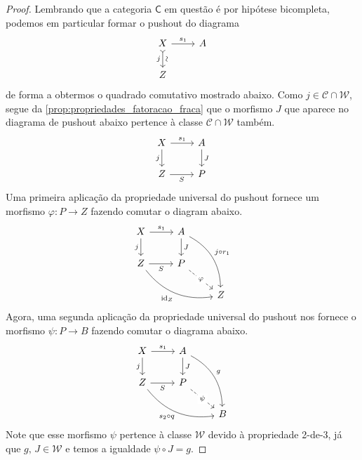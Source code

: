 \begin{proof}
  Lembrando que a categoria $\mathsf{C}$ em questão é por hipótese bicompleta, podemos em particular formar o pushout do diagrama
  \begin{displaymath}
    \begin{tikzcd}
      X
      \arrow[r, "s_{1}"]
      \arrow[d, tail, "j" {swap}, "\sim" {sloped}]
      & A
      \\ Z
    \end{tikzcd}
  \end{displaymath}
  de forma a obtermos o quadrado comutativo mostrado abaixo.
  Como $j \in \mathcal{C} \cap \mathcal{W}$, segue da \cref{prop:propriedades_fatoracao_fraca} que o morfismo $J$ que aparece no diagrama de pushout abaixo pertence à classe $\mathcal{C} \cap \mathcal{W}$ também.
  \begin{equation}
    \label{eq:estrutura_de_modelos_via_fatoracao_fraca_diag_5}
    \begin{tikzcd}
      X
      \arrow[r, "s_{1}"]
      \arrow[d, "j" swap]
      & A
      \arrow[d, "J"]
      \\ Z
      \arrow[r, "S" swap]
      & P
    \end{tikzcd}
  \end{equation}
  Uma primeira aplicação da propriedade universal do pushout fornece um morfismo $\varphi: P \to Z$ fazendo comutar o diagram abaixo.
  \begin{displaymath}
    \begin{tikzcd}
       X
      \arrow[r, "s_{1}"]
      \arrow[d, "j" swap]
      & A
      \arrow[d, "J"]
      \arrow[rdd, bend left=30, "j \circ r_{1}"]
      \\ Z
      \arrow[r, "S" swap]
      \arrow[rrd, bend right=30, "\id_{Z}" swap]
      & P
      \arrow[rd, dashed, "\varphi" description]
      \\ & & Z
    \end{tikzcd}
  \end{displaymath}
  Agora, uma segunda aplicação da propriedade universal do pushout nos fornece o morfismo $\psi: P \to B$ fazendo comutar o diagrama abaixo.
  \begin{displaymath}
    \begin{tikzcd}
      X
      \arrow[r, "s_{1}"]
      \arrow[d, "j" swap]
      & A
      \arrow[d, "J"]
      \arrow[rdd, bend left=30, "g"]
      \\ Z
      \arrow[r, "S" swap]
      \arrow[rrd, bend right=30, "s_{2} \circ q" swap]
      & P
      \arrow[rd, dashed, "\psi" description]
      \\ & & B
    \end{tikzcd}
  \end{displaymath}
  Note que esse morfismo $\psi$ pertence à classe $\mathcal{W}$ devido à propriedade 2-de-3, já que $g,\,J \in \mathcal{W}$ e temos a igualdade $\psi \circ J = g$.


\end{proof}
